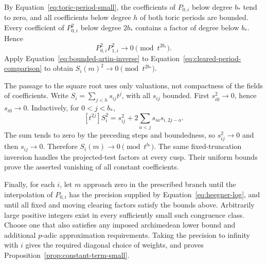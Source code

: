 By Equation~\ref{eq:toric-period-small}, the coefficients of $P_{0,i}$
below degree $b_*$ tend to zero, and all coefficients below degree $h$
of both toric periods are bounded.  Every coefficient of $P_{0,i}^2$
below degree $2b_*$ contains a factor of degree below $b_*$.  Hence
\[
 P_{0,i}^2P_{1,i}^2\longrightarrow0\pmod {t^{2b_*}}.
\]
Apply Equation~\ref{eq:bounded-artin-inverse} to
Equation~\ref{eq:cleared-period-comparison} to obtain
$S_i(m)^2\to0\pmod {t^{2b_*}}$.

The passage to the square root uses only valuations, not compactness
of the fields of coefficients.  Write $S_i=\sum_{j<h}s_{ij}t^j$, with
all $s_{ij}$ bounded.  First $s_{i0}^2\to0$, hence $s_{i0}\to0$.
Inductively, for $0<j<b_*$,
\[
 [t^{2j}]S_i^2
  =s_{ij}^2+2\sum_{a<j}s_{ia}s_{i,2j-a}.
\]
The sum tends to zero by the preceding steps and boundedness, so
$s_{ij}^2\to0$ and then $s_{ij}\to0$.  Therefore
$S_i(m)\to0\pmod {t^{b_*}}$.  The same fixed-truncation inversion
handles the projected-test factors at every cusp.  Their uniform
bounds prove the asserted vanishing of all constant coefficients.

Finally, for each $i$, let $m$ approach zero in the prescribed branch
until the interpolation of $P_{0,i}$ has the precision supplied by
Equation~\ref{eq:heegner-log}, and until all fixed and moving clearing
factors satisfy the bounds above.  Arbitrarily large positive integers
exist in every sufficiently small such congruence class.  Choose one
that also satisfies any imposed archimedean lower bound and additional
$p$-adic approximation requirements.  Taking the precision to infinity
with $i$ gives the required diagonal choice of weights, and proves
Proposition~\ref{prop:constant-term-small}.
